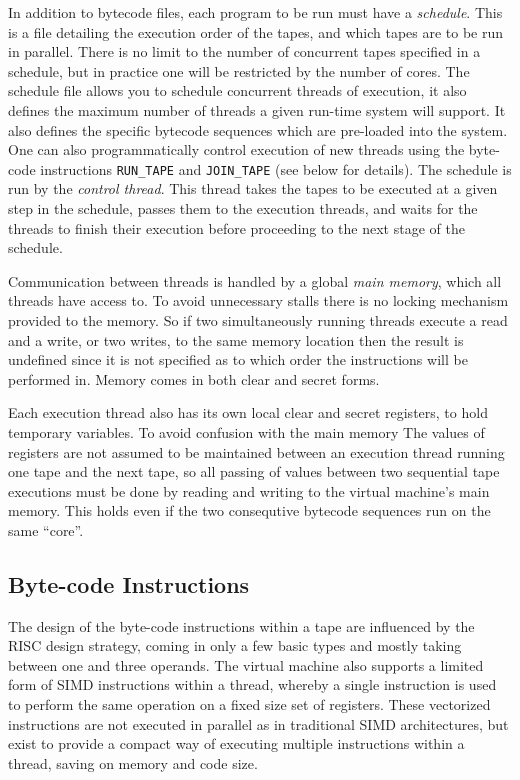 In addition to bytecode files, each program to be run must
have a \emph{schedule}. This is a file detailing the execution
order of the tapes, and which tapes are to be run in parallel.
There is no limit to the number of concurrent tapes specified in a schedule, 
but in practice one will be restricted by the number of cores.
The schedule file allows you to schedule concurrent threads
of execution, it also defines the maximum number of threads
a given run-time system will support. It also defines
the specific bytecode sequences which are pre-loaded
into the system.
One can also programmatically control execution of new
threads using the byte-code instructions \verb+RUN_TAPE+ and \verb+JOIN_TAPE+
(see below for details).
The schedule is run by the \emph{control thread}.
This thread takes the tapes to be executed at a
given step in the schedule, passes them to the execution
threads, and waits for the threads to
finish their execution before proceeding to the next stage of
the schedule.


Communication between threads is handled by a global
\emph{main memory}, which all threads have access to.
To avoid unnecessary stalls there is no locking mechanism provided to
the memory. So if two simultaneously running threads
execute a read and a write, or two writes, to the same
memory location then the result is undefined since it is
not specified as to which order the instructions
will be performed in.
Memory comes in both clear and secret forms.


Each execution thread also has its own local clear and secret
registers, to hold temporary variables.
To avoid confusion with the main memory
The values of registers are not assumed to be maintained
between an execution thread running one tape and
the next tape, so all passing of values
between two sequential tape executions must be done
by reading and writing to the virtual machine's main memory.
This holds even if the two consequtive bytecode
sequences run  on the same ``core''.

\subsection{Byte-code Instructions}

The design of the byte-code instructions within a tape are influenced
by the RISC design strategy, coming in only a few basic
types and mostly taking between one and three
operands. The virtual machine also supports a limited form of
SIMD instructions within a thread, whereby a single instruction is used to
perform the same operation on a fixed size set of registers.
These vectorized instructions are not executed in parallel
as in traditional SIMD architectures, but exist to provide a compact way of
executing multiple instructions within a thread, saving on memory
and code size.

